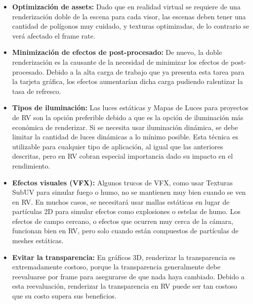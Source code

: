             \begin{itemize}
                \item \textbf{Optimización de assets:} Dado que en realidad virtual se requiere de una renderización doble de la escena para cada visor, las escenas deben tener una cantidad de polígonos muy cuidado, y texturas optimizadas, de lo contrario se verá afectado el frame rate. 
                \item \textbf{Minimización de efectos de post-procesado:} De nuevo, la doble renderización es la causante de la necesidad de minimizar los efectos de post-procesado. Debido a la alta carga de trabajo que ya presenta esta tarea para la tarjeta gráfica, los efectos aumentarían dicha carga pudiendo ralentizar la tasa de refresco.
                \item \textbf{Tipos de iluminación:} Las luces estáticas y Mapas de Luces para proyectos de RV son la opción preferible debido a que es la opción de iluminación más económica de renderizar. Si se necesita usar iluminación dinámica, se debe limitar la cantidad de luces dinámicas a lo mínimo posible. Esta técnica es utilizable para cualquier tipo de aplicación, al igual que las anteriores descritas, pero en RV cobran especial importancia dado su impacto en el rendimiento.
                \item \textbf{Efectos visuales (VFX):} Algunos trucos de VFX, como usar Texturas SubUV para simular fuego o humo, no se mantienen muy bien cuando se ven en RV. En muchos casos, se necesitará usar mallas estáticas en lugar de partículas 2D para simular efectos como explosiones o estelas de humo. Los efectos de campo cercano, o efectos que ocurren muy cerca de la cámara, funcionan bien en RV, pero solo cuando están compuestos de partículas de meshes estáticas.
                \item \textbf{Evitar la transparencia:} En gráficos 3D, renderizar la transparencia es extremadamente costoso, porque la transparencia generalmente debe reevaluarse por frame para asegurarse de que nada haya cambiado. Debido a esta reevaluación, renderizar la transparencia en RV puede ser tan costoso que su costo supera sus beneficios.

            \end{itemize}

